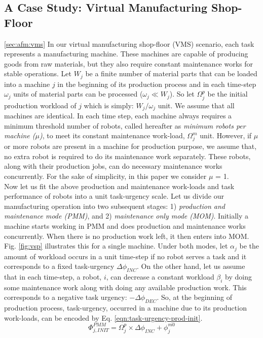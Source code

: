 \documentclass{llncs}
\begin{document}
\subsection{A Case Study: Virtual Manufacturing Shop-Floor}
\ref{sec:afm:vms}
In our virtual manufacturing shop-floor (VMS) scenario, each task represents a manufacturing machine. These machines are capable of producing goods from raw materials, but they also require constant maintenance works for stable operations. Let $W_{j}$ be a finite number of material parts that can be loaded into a machine $j$ in the beginning of its production process and in each time-step $\omega_{j}$ units of material parts can be processed  ($\omega_{j} \ll W_{j} $). So let $\Omega_{j}^{p}$ be the initial production workload of $j$ which is simply: $W_{j} / \omega_{j}$ unit. We assume that all machines are identical. In each time step, each machine always requires a minimum threshold number of robots, called hereafter as {\em minimum robots per machine ($\mu$)}, to meet its constant maintenance work-load, $\Omega_{j}^{m}$ unit. However, if $\mu$ or more robots are present in a machine for production purpose, we assume that, no extra robot is required to do its maintenance work separately. These robots, along with their production jobs, can do necessary maintenance works concurrently. For the sake of simplicity, in this paper we consider $\mu$ = 1.\\
Now let us fit the above production and maintenance work-loads and task performance of robots into a unit task-urgency scale. Let us divide our manufacturing operation into two subsequent stages: 1) {\em production and maintenance mode (PMM)}, and 2) {\em maintenance only mode (MOM)}. Initially a machine starts working in PMM and does production and maintenance works concurrently. When there is no production work left, it then enters into MOM. Fig. \ref{fig:vsp} illustrates this for a single machine.
Under both modes, let $\alpha_{j}$ be the amount of workload occurs in a unit time-step if no robot serves a task and it corresponds to a fixed task-urgency $\Delta \phi_{INC}$. On the other hand, let us assume that in each time-step, a robot, $i$, can decrease a constant workload $\beta_{i}$ by doing some maintenance work along with doing any available production work. This  corresponds to a negative task urgency: $- \Delta \phi_{DEC}$. 
So, at the beginning of production process, task-urgency, occurred in a machine due to its production work-loads, can be encoded by Eq. \ref{eqn:task-urgency-prod-init}.
\begin{equation}
\Phi_{j, INIT}^{PMM} = \Omega_{j}^{p} \times \Delta \phi_{INC} + \phi_{j}^{m0}
\label{eqn:task-urgency-prod-init}
\end{equation}
\end{document}
